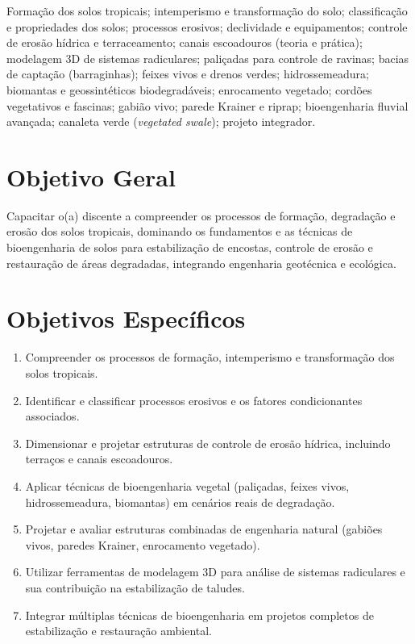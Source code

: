 \documentclass[11pt,a4paper]{article}
\begin{document}
\vspace{0.3cm}



\begin{tcolorbox}[ementabox]
Formação dos solos tropicais; intemperismo e transformação do solo; classificação e propriedades dos solos; processos erosivos; declividade e equipamentos; controle de erosão hídrica e terraceamento; canais escoadouros (teoria e prática); modelagem 3D de sistemas radiculares; paliçadas para controle de ravinas; bacias de captação (barraginhas); feixes vivos e drenos verdes; hidrossemeadura; biomantas e geossintéticos biodegradáveis; enrocamento vegetado; cordões vegetativos e fascinas; gabião vivo; parede Krainer e riprap; bioengenharia fluvial avançada; canaleta verde (\textit{vegetated swale}); projeto integrador.
\end{tcolorbox}


\section*{Objetivo Geral}

Capacitar o(a) discente a compreender os processos de formação, degradação e erosão dos solos tropicais, dominando os fundamentos e as técnicas de bioengenharia de solos para estabilização de encostas, controle de erosão e restauração de áreas degradadas, integrando engenharia geotécnica e ecológica.

\section*{Objetivos Específicos}

\begin{enumerate}

\item Compreender os processos de formação, intemperismo e transformação dos solos tropicais.

\item Identificar e classificar processos erosivos e os fatores condicionantes associados.

\item Dimensionar e projetar estruturas de controle de erosão hídrica, incluindo terraços e canais escoadouros.

\item Aplicar técnicas de bioengenharia vegetal (paliçadas, feixes vivos, hidrossemeadura, biomantas) em cenários reais de degradação.

\item Projetar e avaliar estruturas combinadas de engenharia natural (gabiões vivos, paredes Krainer, enrocamento vegetado).

\item Utilizar ferramentas de modelagem 3D para análise de sistemas radiculares e sua contribuição na estabilização de taludes.

\item Integrar múltiplas técnicas de bioengenharia em projetos completos de estabilização e restauração ambiental.

\end{enumerate}
\end{document}
